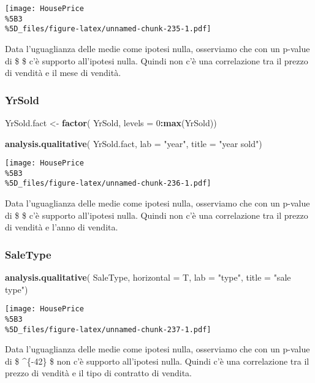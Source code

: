 \documentclass[
]{article}
\newenvironment{Shaded}{\begin{snugshade}}{\end{snugshade}}
\newcommand{\AttributeTok}[1]{\textcolor[rgb]{0.13,0.29,0.53}{#1}}
\newcommand{\DecValTok}[1]{\textcolor[rgb]{0.00,0.00,0.81}{#1}}
\newcommand{\FunctionTok}[1]{\textcolor[rgb]{0.13,0.29,0.53}{\textbf{#1}}}
\newcommand{\NormalTok}[1]{#1}
\newcommand{\OtherTok}[1]{\textcolor[rgb]{0.56,0.35,0.01}{#1}}
\newcommand{\SpecialCharTok}[1]{\textcolor[rgb]{0.81,0.36,0.00}{\textbf{#1}}}
\newcommand{\StringTok}[1]{\textcolor[rgb]{0.31,0.60,0.02}{#1}}
\begin{document}
\texttt{[image: HousePrice\\\%5B3\\\%5D\_files/figure-latex/unnamed-chunk-235-1.pdf]}

Data l'uguaglianza delle medie come ipotesi nulla, osserviamo che con un
p-value di \$  \$ c'è supporto all'ipotesi nulla. Quindi non
c'è una correlazione tra il prezzo di vendità e il mese di vendità.

\subsubsection{YrSold}\label{yrsold-1}

\begin{Shaded}
\begin{Highlighting}[]
\NormalTok{YrSold.fact }\OtherTok{\textless{}{-}} \FunctionTok{factor}\NormalTok{(}
\NormalTok{    YrSold,}
    \AttributeTok{levels =} \DecValTok{0}\SpecialCharTok{:}\FunctionTok{max}\NormalTok{(YrSold))}

\FunctionTok{analysis.qualitative}\NormalTok{(}
\NormalTok{    YrSold.fact,}
    \AttributeTok{lab =} \StringTok{"year"}\NormalTok{,}
    \AttributeTok{title =} \StringTok{"year sold"}\NormalTok{)}
\end{Highlighting}
\end{Shaded}

\texttt{[image: HousePrice\\\%5B3\\\%5D\_files/figure-latex/unnamed-chunk-236-1.pdf]}

Data l'uguaglianza delle medie come ipotesi nulla, osserviamo che con un
p-value di \$  \$ c'è supporto all'ipotesi nulla. Quindi non
c'è una correlazione tra il prezzo di vendità e l'anno di vendita.

\subsubsection{SaleType}\label{saletype-1}

\begin{Shaded}
\begin{Highlighting}[]
\FunctionTok{analysis.qualitative}\NormalTok{(}
\NormalTok{    SaleType,}
    \AttributeTok{horizontal =}\NormalTok{ T,}
    \AttributeTok{lab =} \StringTok{"type"}\NormalTok{,}
    \AttributeTok{title =} \StringTok{"sale type"}\NormalTok{)}
\end{Highlighting}
\end{Shaded}

\texttt{[image: HousePrice\\\%5B3\\\%5D\_files/figure-latex/unnamed-chunk-237-1.pdf]}

Data l'uguaglianza delle medie come ipotesi nulla, osserviamo che con un
p-value di \$ \^{}\{-42\} \$ non c'è supporto all'ipotesi
nulla. Quindi c'è una correlazione tra il prezzo di vendità e il tipo di
contratto di vendita.
\end{document}
